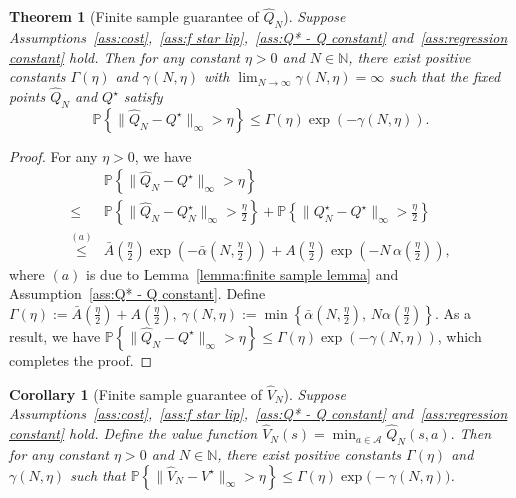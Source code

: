 \documentclass[letterpaper, 10 pt, conference]{ieeeconf}  %
\newtheorem{theorem}{Theorem}
\newtheorem{corollary}{Corollary}
\begin{document}
\begin{theorem}[Finite sample guarantee of $\hat{Q}_N$]\label{thm:finite sample}
Suppose Assumptions\ \ref{ass:cost},\ \ref{ass:f star lip},\ \ref{ass:Q* - Q constant} and\ \ref{ass:regression constant} hold. Then for any constant $\eta>0$ and $N \in \mathbb N$, there exist positive constants $\Gamma(\eta)$ and $\gamma(N,\eta)$ with $\lim_{N\to\infty} \gamma(N,\eta)=\infty$ such that the fixed points $\hat{Q}_N$ and $Q^\star$ satisfy 
$$\mathbb P \left\{\|\hat{Q}_N-Q^\star\|_\infty > \eta \right\} \le \Gamma(\eta) \exp{(-\gamma(N,\eta))}.$$
\end{theorem}
\begin{proof}
For any $\eta>0$, we have
\begin{align}
&\mathbb P\!\left\{\|\hat Q_N-Q^\star\|_\infty>\eta\right\}\nonumber \\
\le&
\mathbb P\!\left\{\|\hat Q_N-Q_N^\star\|_\infty>\tfrac{\eta}{2}\right\}
+
\mathbb P\!\left\{\|Q_N^\star-Q^\star\|_\infty>\tfrac{\eta}{2}\right\}\nonumber \\ 
\overset{(a)}{\le}&
\bar A\!\left(\tfrac{\eta}{2}\right)\exp(-\bar\alpha\left(N,\tfrac{\eta}{2}\right))
+
A\!\left(\tfrac{\eta}{2}\right)\exp(-N\,\alpha\!\left(\tfrac{\eta}{2}\right)),\nonumber
\end{align}
where $(a)$ is due to Lemma\ \ref{lemma:finite sample lemma} and Assumption\ \ref{ass:Q* - Q constant}. Define $\Gamma(\eta)
:=\bar A\!\left(\tfrac{\eta}{2}\right)+A\!\left(\tfrac{\eta}{2}\right),\ \gamma(N,\eta)
:=\min\!\left\{\bar\alpha\!\left(N,\tfrac{\eta}{2}\right),\,N\alpha\!\left(\tfrac{\eta}{2}\right)\right\}.$
As a result, we have $\mathbb P\!\left\{\|\hat Q_N-Q^\star\|_\infty>\eta\right\}
\le
\Gamma(\eta)\exp(-\gamma(N,\eta))$,
which completes the proof.
\end{proof}
\begin{corollary}[Finite sample guarantee of $\hat{V}_N$]\label{coro:fsg for vn}
Suppose Assumptions\ \ref{ass:cost},\ \ref{ass:f star lip},\ \ref{ass:Q* - Q constant} and\ \ref{ass:regression constant} hold. Define the value function $\hat{V}_N(s)=\min_{a\in\mathcal A}\hat{Q}_N(s,a).$ Then for any constant $\eta>0$ and $N \in \mathbb N$, there exist positive constants $\Gamma(\eta)$ and $\gamma(N,\eta)$ such that
$\mathbb P\left\{\|\hat{V}_N-V^\star\|_\infty>\eta\right\}
\le
\Gamma(\eta)\exp\bigl(-\gamma(N,\eta)\bigr)$.
\end{corollary}
\end{document}
